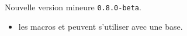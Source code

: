 Nouvelle version mineure \verb+0.8.0-beta+.

\begin{itemize}[itemsep=.5em]
    \item {}
          les macros  et  peuvent s'utiliser avec une base.
    
\end{itemize}

\separation